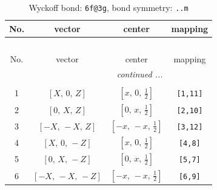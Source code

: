 \documentclass[fleqn,8pt]{jsarticle}
\begin{document}
\begin{longtable}{cccc}
\caption{Wyckoff bond: {\tt 6f@3g}, bond symmetry: {\tt ..m}}
 \\
 \hline \hline
No. & vector & center & mapping \\ \hline \endfirsthead

\multicolumn{3}{l}{\tablename\ \thetable{}} \\
 \hline \hline
No. & vector & center & mapping \\ \hline \endhead

 \hline \hline
\multicolumn{3}{r}{\footnotesize\it continued ...} \\ \endfoot

 \hline \hline
\multicolumn{3}{r}{} \\ \endlastfoot

1 & $\left[ X,\, 0,\, Z \right]$ & $\left[ x,\, 0,\, \frac{1}{2} \right]$ & {\tt [1,11]} \\ \hline
2 & $\left[ 0,\, X,\, Z \right]$ & $\left[ 0,\, x,\, \frac{1}{2} \right]$ & {\tt [2,10]} \\ \hline
3 & $\left[ - X,\, - X,\, Z \right]$ & $\left[ - x,\, - x,\, \frac{1}{2} \right]$ & {\tt [3,12]} \\ \hline
4 & $\left[ X,\, 0,\, - Z \right]$ & $\left[ x,\, 0,\, \frac{1}{2} \right]$ & {\tt [4,8]} \\ \hline
5 & $\left[ 0,\, X,\, - Z \right]$ & $\left[ 0,\, x,\, \frac{1}{2} \right]$ & {\tt [5,7]} \\ \hline
6 & $\left[ - X,\, - X,\, - Z \right]$ & $\left[ - x,\, - x,\, \frac{1}{2} \right]$ & {\tt [6,9]} \\
\end{longtable}
\renewcommand{\arraystretch}{1.2}
\end{document}
